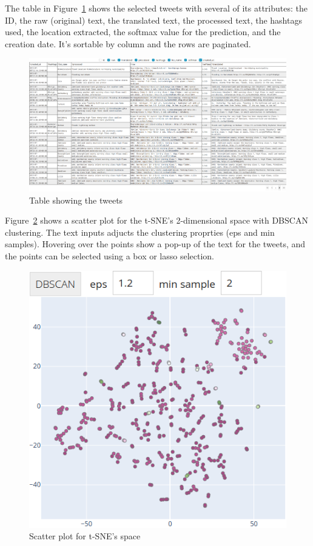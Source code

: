 The table in Figure~\ref{fig:tweets_table} shows the selected tweets with several of its attributes: the ID, the raw
(original) text, the translated text, the processed text, the hashtags used, the location extracted,
the softmax value for the prediction, and the creation date. It's sortable by column and the rows
are paginated.

\begin{figure}[H]
\begin{center}
  \includegraphics[width=\columnwidth]{./images/tweets_table.png}
\end{center}
\caption{Table showing the tweets}
\label{fig:tweets_table}
\end{figure}

Figure~\ref{fig:scatter} shows a scatter plot for the \ac{t-SNE}'s 2-dimensional space with
\ac{DBSCAN} clustering. The text inputs adjucts the clustering proprties (eps and min samples).
Hovering over the points show a pop-up of the text for the tweets, and the points can be selected
using a box or lasso selection. 

\begin{figure}[H]
\begin{center}
  \includegraphics[width=0.666\columnwidth]{./images/scatter.png}
\end{center}
\caption{Scatter plot for \ac{t-SNE}'s space}
\label{fig:scatter}
\end{figure}

